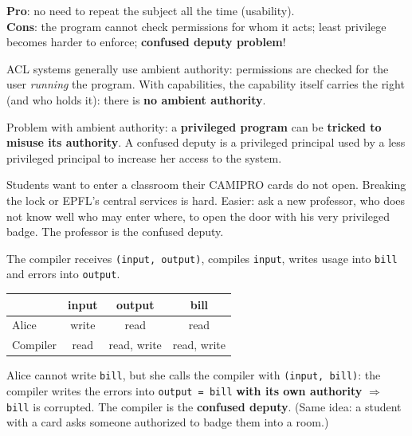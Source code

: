 \begin{propbox}[title=Ambient authority: pros and cons]
\textbf{Pro}: no need to repeat the subject all the time (usability). \\
\textbf{Cons}: the program cannot check permissions for whom it acts; least privilege
becomes harder to enforce; \textbf{confused deputy problem}!
\end{propbox}

\begin{rembox}[title={ACLs, capabilities and ambient authority}]
ACL systems generally use ambient authority: permissions are checked for the user \emph{running}
the program. With capabilities, the capability itself carries the right (and who holds it):
there is \textbf{no ambient authority}.
\end{rembox}

\begin{defnbox}[title=Confused deputy problem]
Problem with ambient authority: a \textbf{privileged program} can be \textbf{tricked to
misuse its authority}. A confused deputy is a privileged principal used by a less privileged
principal to increase her access to the system.
\end{defnbox}

\begin{exbox}[title=The CAMIPRO story]
Students want to enter a classroom their CAMIPRO cards do not open. Breaking the lock or EPFL's
central services is hard. Easier: ask a new professor, who does not know well who may enter
where, to open the door with his very privileged badge. The professor is the confused deputy.
\end{exbox}

\begin{exbox}[title=Pay-per-use compiler]
The compiler receives \texttt{(input, output)}, compiles \texttt{input}, writes usage
into \texttt{bill} and errors into \texttt{output}.
\begin{center}
\begin{tabular}{l|c|c|c}
         & input & output      & bill        \\ \hline
Alice    & write & read        & read        \\
Compiler & read  & read, write & read, write
\end{tabular}
\end{center}
Alice cannot write \texttt{bill}, but she calls the compiler with
\texttt{(input, bill)}: the compiler writes the errors into \texttt{output = bill}
\textbf{with its own authority} $\Rightarrow$ \texttt{bill} is corrupted. The compiler
is the \textbf{confused deputy}. (Same idea: a student with a card asks someone
authorized to badge them into a room.)
\end{exbox}


